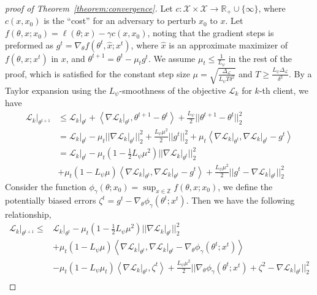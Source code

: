 \documentclass{article} %
\theoremstyle{plain}
\theoremstyle{definition}
\theoremstyle{remark}
\begin{document}
\begin{proof}[proof of Theorem~\ref{theorem:convergence}] 
Let $c:\mathcal{X}\times\mathcal{X}\rightarrow\mathbb{R}_{+} \cup \{\infty\}$, where $c(x,x_0)$ is the ``cost'' for an adversary to perturb $x_0$ to $x$.
Let $f(\theta,x;x_0)=\ell(\theta;x)-\gamma c(x,x_0)$, noting that the gradient steps is preformed as $g^t=\nabla_{\theta}f(\theta^t,\hat{x};x^t)$, where $\hat{x}$ is an approximate maximizer of $f(\theta,x;x^t)$ in $x$, and $\theta^{t+1}=\theta^t-\mu_t g^t$. We assume $\mu_t\leq\frac{1}{L_{\psi}}$ in the rest of the proof, which is satisfied for the constant step size $\mu=\sqrt{\frac{\Delta_{\mathcal{L}}}{L_{\psi}T\delta^2}}$ and $T\geq\frac{L_{\psi}\Delta_{\mathcal{L}}}{\delta^2}$. By a Taylor expansion using the $L_{\psi}$-smoothness of the objective $\mathcal{L}_k$ for $k$-th client, we have
\begin{align}
    \mathcal{L}_k\big|_{\theta^{t+1}}&\leq\mathcal{L}_k\big|_{\theta^t}+\left\langle\nabla\mathcal{L}_k\big|_{\theta^t},\theta^{t+1}-\theta^{t}\right\rangle+\frac{L_{\psi}}{2}||\theta^{t+1}-\theta^{t}||_2^2\\
    &= \mathcal{L}_k\big|_{\theta^t}-\mu_t||\nabla\mathcal{L}_k\big|_{\theta^t}||_2^2+\frac{L_{\psi}\mu^2}{2}||g^t||_2^2+\mu_t\left\langle\nabla\mathcal{L}_k\big|_{\theta^t},\nabla\mathcal{L}_k\big|_{\theta^t}-g^t\right\rangle\nonumber\\
    &= \mathcal{L}_k\big|_{\theta^t}-\mu_t\left(1-\frac{1}{2}L_{\psi}\mu^2\right)||\nabla\mathcal{L}_k\big|_{\theta^t}||_2^2\nonumber\\
    &+\mu_t(1-L_{\psi}\mu)\left\langle\nabla\mathcal{L}_k\big|_{\theta^t},\nabla\mathcal{L}_k\big|_{\theta^t}-g^t \right\rangle+\frac{L_{\psi}\mu^2}{2}||g^t-\nabla\mathcal{L}_k\big|_{\theta^t}||_2^2 \nonumber
\end{align}
Consider the function $\phi_{\gamma}(\theta;x_0)=\sup_{x\in \mathbb{Z}}f(\theta,x;x_0)$, we define the potentially biased errors $\zeta^t=g^t-\nabla_{\theta}\phi_{\gamma}(\theta^t;x^t)$. Then we have the following relationship,
\begin{align}
    \mathcal{L}_k\big|_{\theta^{t+1}}\leq&\mathcal{L}_k\big|_{\theta^{t}}-\mu_t\left(1-\frac{1}{2}L_{\psi}\mu^2\right)||\nabla\mathcal{L}_k\big|_{\theta^{t}}||_2^2\\
    &+\mu_t(1-L_{\psi}\mu)\left\langle\nabla\mathcal{L}_k\big|_{\theta^{t}},\nabla\mathcal{L}_k\big|_{\theta^{t}}-\nabla_{\theta}\phi_{\gamma}(\theta^t;x^t) \right\rangle\nonumber\\
    &-\mu_t(1-L_{\psi}\mu_t)\left\langle \nabla\mathcal{L}_k\big|_{\theta^{t}},\zeta^t \right\rangle +\frac{L_{\psi}\mu^2}{2}||\nabla_{\theta}\phi_{\gamma}(\theta^t;x^t)+\zeta^2-\nabla\mathcal{L}_k\big|_{\theta^{t}}||_2^2 \nonumber\\

\end{align}
\end{proof}
\end{document}
